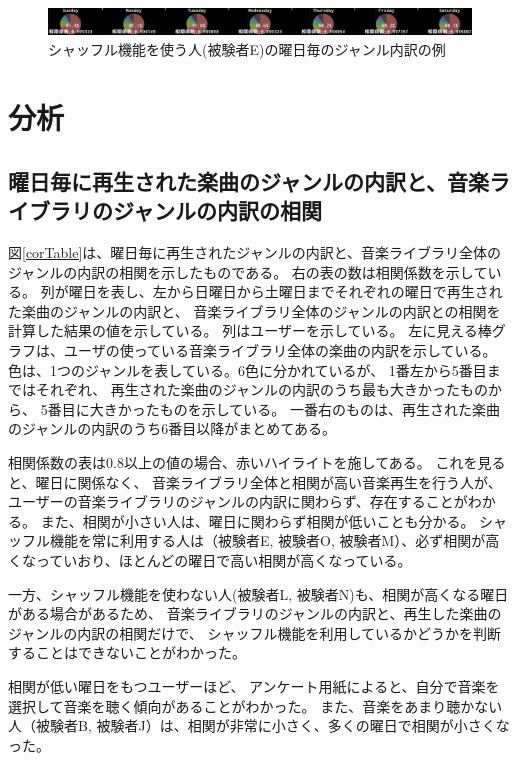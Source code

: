 \documentclass[11pt, onecolumn]{jsarticle}
\begin{document}
\begin{figure}[h]
\begin{center}
\includegraphics[width=14cm]{taru_weekGenreRatio.jpg}
\caption{シャッフル機能を使う人(被験者E)の曜日毎のジャンル内訳の例}
\label{weekGenreMap_shuffle}
\end{center}
\end{figure}

\clearpage

\section{分析}
\subsection{曜日毎に再生された楽曲のジャンルの内訳と、音楽ライブラリのジャンルの内訳の相関}
図\ref{corTable}は、曜日毎に再生されたジャンルの内訳と、音楽ライブラリ全体のジャンルの内訳の相関を示したものである。
右の表の数は相関係数を示している。
列が曜日を表し、左から日曜日から土曜日までそれぞれの曜日で再生された楽曲のジャンルの内訳と、
音楽ライブラリ全体のジャンルの内訳との相関を計算した結果の値を示している。
列はユーザーを示している。
左に見える棒グラフは、ユーザの使っている音楽ライブラリ全体の楽曲の内訳を示している。
色は、1つのジャンルを表している。6色に分かれているが、
1番左から5番目まではそれぞれ、
再生された楽曲のジャンルの内訳のうち最も大きかったものから、
5番目に大きかったものを示している。
一番右のものは、再生された楽曲のジャンルの内訳のうち6番目以降がまとめてある。

相関係数の表は0.8以上の値の場合、赤いハイライトを施してある。
これを見ると、曜日に関係なく、
音楽ライブラリ全体と相関が高い音楽再生を行う人が、
ユーザーの音楽ライブラリのジャンルの内訳に関わらず、存在することがわかる。
また、相関が小さい人は、曜日に関わらず相関が低いことも分かる。
シャッフル機能を常に利用する人は（被験者E, 被験者O, 被験者M）、必ず相関が高くなっていおり、ほとんどの曜日で高い相関が高くなっている。

一方、シャッフル機能を使わない人(被験者L, 被験者N)も、相関が高くなる曜日がある場合があるため、
音楽ライブラリのジャンルの内訳と、再生した楽曲のジャンルの内訳の相関だけで、
シャッフル機能を利用しているかどうかを判断することはできないことがわかった。

相関が低い曜日をもつユーザーほど、
アンケート用紙によると、自分で音楽を選択して音楽を聴く傾向があることがわかった。
また、音楽をあまり聴かない人（被験者B, 被験者J）は、相関が非常に小さく、多くの曜日で相関が小さくなった。
\end{document}
